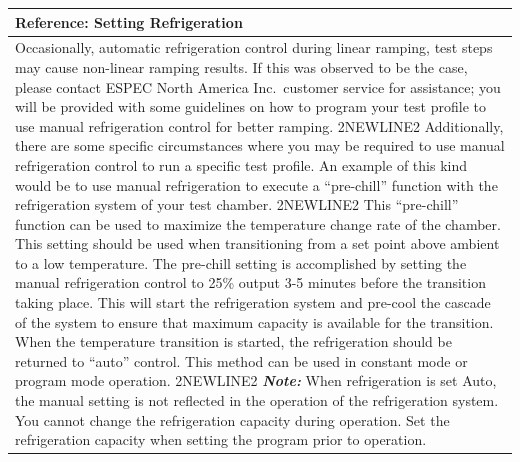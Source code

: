 \begin{longtable}[]{@{}l@{}}
\toprule
\begin{minipage}[b]{0.97\columnwidth}\raggedright
\textbf{Reference}: Setting Refrigeration\strut
\end{minipage}\tabularnewline
\midrule
\endhead
\begin{minipage}[t]{0.97\columnwidth}\raggedright
Occasionally, automatic refrigeration control during linear ramping,
test steps may cause non-linear ramping results. If this was observed to
be the case, please contact ESPEC North America Inc.~customer service
for assistance; you will be provided with some guidelines on how to
program your test profile to use manual refrigeration control for better
ramping. 2NEWLINE2 Additionally, there are some specific circumstances
where you may be required to use manual refrigeration control to run a
specific test profile. An example of this kind would be to use manual
refrigeration to execute a ``pre-chill'' function with the refrigeration
system of your test chamber. 2NEWLINE2 This ``pre-chill'' function can
be used to maximize the temperature change rate of the chamber. This
setting should be used when transitioning from a set point above ambient
to a low temperature. The pre-chill setting is accomplished by setting
the manual refrigeration control to 25\% output 3-5 minutes before the
transition taking place. This will start the refrigeration system and
pre-cool the cascade of the system to ensure that maximum capacity is
available for the transition. When the temperature transition is
started, the refrigeration should be returned to ``auto'' control. This
method can be used in constant mode or program mode operation. 2NEWLINE2
\textbf{\emph{Note:}} When refrigeration is set Auto, the manual setting
is not reflected in the operation of the refrigeration system. You
cannot change the refrigeration capacity during operation. Set the
refrigeration capacity when setting the program prior to
operation.\strut
\end{minipage}\tabularnewline
\bottomrule
\end{longtable}

